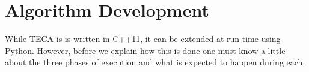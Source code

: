 \documentclass[a4paper,10pt,DIV=12]{scrreprt}
\begin{document}
%


\section{Algorithm Development}
\label{sec:py_devel}
While TECA is is written in C++11, it can be extended at run time using Python. However, before we explain how this is done one must know a little about the three phases of execution and what is expected to happen during each.
\end{document}
